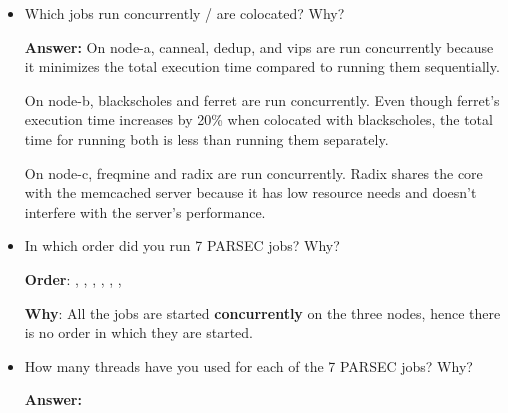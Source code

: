 \begin{enumerate}
\begin{itemize}
\begin{itemize}
            \item {}: %
            Node-c, as it has the least resource requirements, and just one of the low performing cores in node-c is sufficient for it. Being very low demanding do not interfere much with freqmine neither interfere at all with memcached.

            \item {}: %
            Node-a, because it requires high memory transfer speed which node-a provides being the best spec machine amongst all.
            
        \end{itemize}

        Further explanation on our motivations is given in the section regarding design choices at the end of Part 3.

        \item Which jobs run concurrently / are colocated? Why?

        \textbf{Answer:} %
        On node-a, canneal, dedup, and vips are run concurrently because it minimizes the total execution time compared to running them sequentially.
        
        On node-b, blackscholes and ferret are run concurrently. Even though ferret's execution time increases by 20\% when colocated with blackscholes, the total time for running both is less than running them separately.
        
        On node-c, freqmine and radix are run concurrently. Radix shares the core with the memcached server because it has low resource needs and doesn't interfere with the server's performance.

        \item In which order did you run 7 PARSEC jobs? Why?
    
        \textbf{Order}: %
        , , , , , , 
    
    
        \textbf{Why}: %
        All the jobs are started \textbf{concurrently} on the three nodes, hence there is no order in which they are started.

        \item How many threads have you used for each of the 7 PARSEC jobs? Why?
    
        \textbf{Answer:}
    

\end{itemize}
\end{enumerate}
